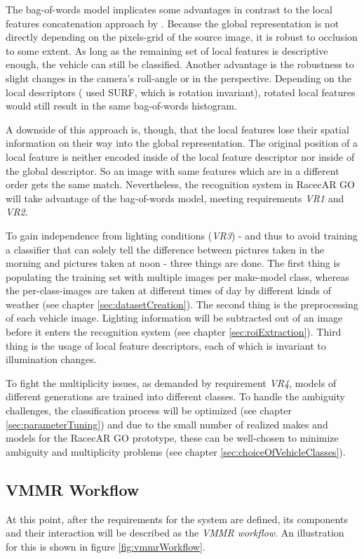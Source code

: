 The bag-of-words model implicates some advantages in contrast to the local features concatenation approach by \citeauthor{petrovic2004analysis}. Because the global representation is not directly depending on the pixels-grid of the source image, it is robust to occlusion to some extent. As long as the remaining set of local features is descriptive enough, the vehicle can still be classified. Another advantage is the robustness to slight changes in the camera's roll-angle or in the perspective. Depending on the local descriptors (\citeauthor{siddiqui2015robust} used SURF, which is rotation invariant), rotated local features would still result in the same bag-of-words histogram.

A downside of this approach is, though, that the local features lose their spatial information on their way into the global representation. The original position of a local feature is neither encoded inside of the local feature descriptor nor inside of the global descriptor. So an image with same features which are in a different order gets the same match. Nevertheless, the recognition system in RacecAR GO will take advantage of the bag-of-words model, meeting requirements \emph{VR1} and \emph{VR2}.

To gain independence from lighting conditions (\emph{VR3}) - and thus to avoid training a classifier that can solely tell the difference between pictures taken in the morning and pictures taken at noon - three things are done. The first thing is populating the training set with multiple images per make-model class, whereas the per-class-images are taken at different times of day by different kinds of weather (see chapter \ref{sec:datasetCreation}). The second thing is the preprocessing of each vehicle image. Lighting information will be subtracted out of an image before it enters the recognition system (see chapter \ref{sec:roiExtraction}). Third thing is the usage of local feature descriptors, each of which is invariant to illumination changes.

To fight the multiplicity issues, as demanded by requirement \emph{VR4}, models of different generations are trained into different classes. To handle the ambiguity challenges, the classification process will be optimized (see chapter \ref{sec:parameterTuning}) and due to the small number of realized makes and models for the RacecAR GO prototype, these can be well-chosen to minimize ambiguity and multiplicity problems (see chapter \ref{sec:choiceOfVehicleClasses}).

\subsection{VMMR Workflow}
At this point, after the requirements for the system are defined, its components and their interaction will be described as the \emph{VMMR workflow}. An illustration for this is shown in figure \ref{fig:vmmrWorkflow}.

